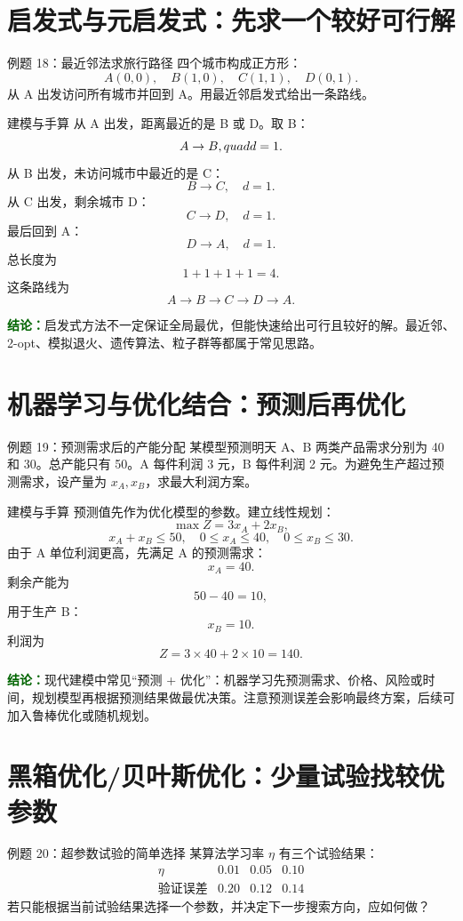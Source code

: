 \documentclass[UTF8,12pt,a4paper]{ctexart}
\newcommand{\conclusion}[1]{\par\smallskip\noindent\textcolor{darkgreen}{\textbf{结论：}}#1\par\smallskip}
\begin{document}
\section{启发式与元启发式：先求一个较好可行解}
\begin{examplebox}{例题 18：最近邻法求旅行路径}
四个城市构成正方形：
\[
A(0,0),\quad B(1,0),\quad C(1,1),\quad D(0,1).
\]
从 A 出发访问所有城市并回到 A。用最近邻启发式给出一条路线。
\end{examplebox}

\begin{solbox}{建模与手算}
从 A 出发，距离最近的是 B 或 D。取 B：
\[
A\to B,\\quad d=1.
\]
从 B 出发，未访问城市中最近的是 C：
\[
B\to C,
\quad d=1.
\]
从 C 出发，剩余城市 D：
\[
C\to D,
\quad d=1.
\]
最后回到 A：
\[
D\to A,
\quad d=1.
\]
总长度为
\[
1+1+1+1=4.
\]
这条路线为
\[
A\to B\to C\to D\to A.
\]
\end{solbox}
\conclusion{启发式方法不一定保证全局最优，但能快速给出可行且较好的解。最近邻、2-opt、模拟退火、遗传算法、粒子群等都属于常见思路。}

\section{机器学习与优化结合：预测后再优化}
\begin{examplebox}{例题 19：预测需求后的产能分配}
某模型预测明天 A、B 两类产品需求分别为 40 和 30。总产能只有 50。A 每件利润 3 元，B 每件利润 2 元。为避免生产超过预测需求，设产量为 $x_A,x_B$，求最大利润方案。
\end{examplebox}

\begin{solbox}{建模与手算}
预测值先作为优化模型的参数。建立线性规划：
\[
\max Z=3x_A+2x_B,
\]
\[
x_A+x_B\le 50,
\quad 0\le x_A\le40,
\quad 0\le x_B\le30.
\]
由于 A 单位利润更高，先满足 A 的预测需求：
\[
x_A=40.
\]
剩余产能为
\[
50-40=10,
\]
用于生产 B：
\[
x_B=10.
\]
利润为
\[
Z=3\times40+2\times10=140.
\]
\end{solbox}
\conclusion{现代建模中常见“预测 + 优化”：机器学习先预测需求、价格、风险或时间，规划模型再根据预测结果做最优决策。注意预测误差会影响最终方案，后续可加入鲁棒优化或随机规划。}

\section{黑箱优化/贝叶斯优化：少量试验找较优参数}
\begin{examplebox}{例题 20：超参数试验的简单选择}
某算法学习率 $\eta$ 有三个试验结果：
\[
\begin{array}{c|ccc}
\eta&0.01&0.05&0.10\\
\hline
\text{验证误差}&0.20&0.12&0.14
\end{array}
\]
若只能根据当前试验结果选择一个参数，并决定下一步搜索方向，应如何做？
\end{examplebox}
\end{document}
